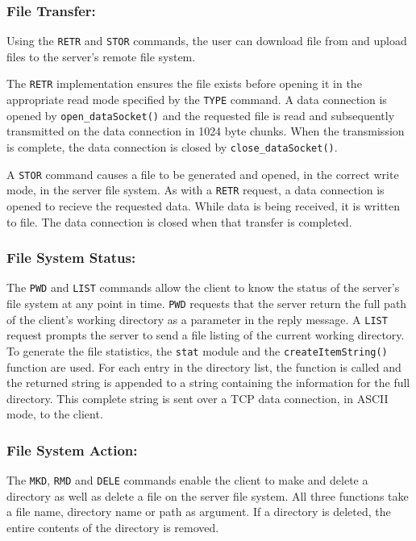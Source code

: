 \documentclass[10pt,twocolumn]{witseiepaper}
\begin{document}
\subsubsection*{File Transfer:}
Using the \texttt{RETR} and \texttt{STOR} commands, the user can download file from and upload files to the server's remote file system. 

The \texttt{RETR} implementation ensures the file exists before opening it in the appropriate read mode specified by the \texttt{TYPE} command. A data connection is opened by \texttt{open\_dataSocket()} and the requested file is read and subsequently transmitted on the data connection in 1024 byte chunks. When the transmission is complete, the data connection is closed by \texttt{close\_dataSocket()}.

A \texttt{STOR} command causes a file to be generated and opened, in the correct write mode, in the server file system. As with a \texttt{RETR} request, a data connection is opened to recieve the requested data. While data is being received, it is written to file. The data connection is closed when that transfer is completed.

\vspace*{-2mm}
\subsubsection*{File System Status: }
The \texttt{PWD} and \texttt{LIST} commands allow the client to know the status of the server's file system at any point in time. \texttt{PWD} requests that the server return the full path of the client's working directory as a parameter in the reply message. A \texttt{LIST} request prompts the server to send a file listing of the current working directory. To generate the file statistics, the \texttt{stat} module and the \texttt{createItemString()} function are used. For each entry in the directory list, the function is called and the returned string is appended to a string containing the information for the full directory. This complete string is sent over a TCP data connection, in ASCII mode, to the client. 

\vspace*{-2mm}
\subsubsection*{File System Action: }
The \texttt{MKD}, \texttt{RMD} and \texttt{DELE} commands enable the client to make and delete a directory as well as delete a file on the server file system. All three functions take a file name, directory name or path as argument. If a directory is deleted, the entire contents of the directory is removed.
\end{document}
